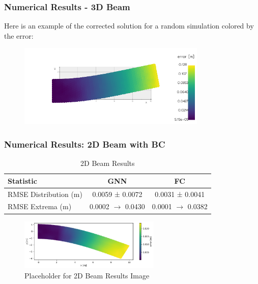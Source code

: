 \documentclass{beamer}
\begin{document}
\begin{frame}
    \frametitle{Numerical Results - 3D Beam}
    Here is an example of the corrected solution for a random simulation colored by the error:
    \begin{figure}
        \centering
        \includegraphics[width=0.8\textwidth]{Images/output_3D_beam.png}
    \end{figure}
\end{frame}

\begin{frame}
    \frametitle{Numerical Results: 2D Beam with BC}
    \begin{table}[h]
        \small
        \centering
        \begin{tabular}{|l|c|c|}
            \hline
            \textbf{Statistic} & \textbf{GNN} & \textbf{FC} \\ \hline
            RMSE Distribution (m) & 0.0059 ± 0.0072 & 0.0031 ± 0.0041 \\ \hline
            RMSE Extrema (m) & 0.0002 \(\rightarrow\) 0.0430 & 0.0001 \(\rightarrow\) 0.0382 \\ \hline
        \end{tabular}
        \caption{2D Beam Results}
    \end{table}
    \begin{figure}[h]
        \centering
        \includegraphics[width=0.6\textwidth]{Images/output_2D_beam.png}
        \caption{Placeholder for 2D Beam Results Image}
    \end{figure}
\end{frame}
\end{document}
